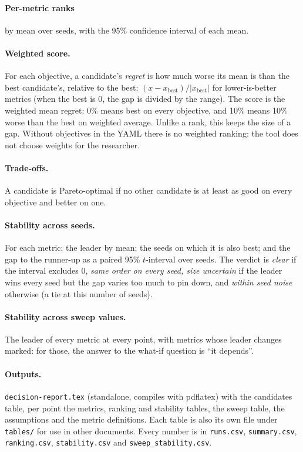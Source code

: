 \documentclass[11pt,a4paper]{article}
\newcommand{\code}[1]{\texttt{#1}}
\begin{document}
\paragraph{Per-metric ranks} by mean over seeds, with the 95\% confidence interval of each mean.

\paragraph{Weighted score.} For each objective, a candidate's \emph{regret} is how much worse its mean is than
the best candidate's, relative to the best: $(x - x_{\text{best}})/|x_{\text{best}}|$ for lower-is-better metrics
(when the best is 0, the gap is divided by the range). The score is the weighted mean regret: 0\% means best on
every objective, and 10\% means 10\% worse than the best on weighted average. Unlike a rank, this keeps the size of
a gap. Without objectives in the YAML there is no weighted ranking: the tool does not choose weights for the
researcher.

\paragraph{Trade-offs.} A candidate is Pareto-optimal if no other candidate is at least as good on every
objective and better on one.

\paragraph{Stability across seeds.} For each metric: the leader by mean; the seeds on which it is also best; and
the gap to the runner-up as a paired 95\% $t$-interval over seeds. The verdict is \emph{clear} if the interval
excludes 0, \emph{same order on every seed, size uncertain} if the leader wins every seed but the gap varies too
much to pin down, and \emph{within seed noise} otherwise (a tie at this number of seeds).

\paragraph{Stability across sweep values.} The leader of every metric at every point, with metrics whose leader
changes marked: for those, the answer to the what-if question is ``it depends''.

\paragraph{Outputs.} \code{decision-report.tex} (standalone, compiles with pdflatex) with the candidates table,
per point the metrics, ranking and stability tables, the sweep table, the assumptions and the metric definitions.
Each table is also its own file under \code{tables/} for use in other documents. Every number is in
\code{runs.csv}, \code{summary.csv}, \code{ranking.csv}, \code{stability.csv} and \code{sweep\_stability.csv}.
\end{document}
